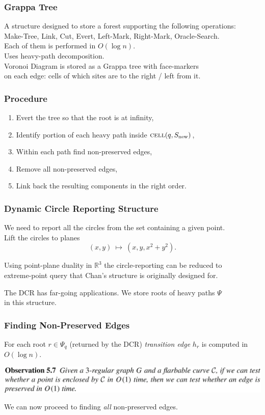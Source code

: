 \begin{frame} \frametitle{Grappa Tree}
	A structure designed to store a forest supporting the following operations: \\
	Make-Tree, Link, Cut, Evert, Left-Mark, Right-Mark, Oracle-Search. \\
	Each of them is performed in $O(\log n)$. \\ \bigskip
	Uses heavy-path decomposition. \\ \bigskip
	Voronoi Diagram is stored as a Grappa tree with face-markers \\
	on each edge: cells of which sites are to the right / left from it.
\end{frame}

\begin{frame} \frametitle{Procedure}
\begin{enumerate}
	\item Evert the tree so that the root is at infinity, \medskip
	\item Identify portion of each heavy path inside $\text{\scshape cell} (q, S_{\text{new}})$, \medskip
	\item Within each path find non-preserved edges, \medskip
	\item Remove all non-preserved edges, \medskip
	\item Link back the resulting components in the right order.
\end{enumerate}
\end{frame}

\begin{frame} \frametitle{Dynamic Circle Reporting Structure} \label{pg:dcr}
	We need to report all the circles from the set containing a given point. \\
	Lift the circles to planes
	$$(x,y)\ \mapsto\ (x,y,x^2+y^2).$$ \vspace{-0.4cm}
	
	Using point-plane duality in $\mathbb R^3$ the circle-reporting can be reduced to \\
	extreme-point query that Chan's structure is originally designed for. \bigskip
	
	The DCR has far-going applications. We store roots of heavy paths $\Psi$ \\
	in this structure.
\end{frame}

\begin{frame} \frametitle{Finding Non-Preserved Edges}
	For each root $r \in \Psi_q$ (returned by the DCR) {\it transition edge} $h_r$ is computed in $O(\log n)$. \\ [0.8cm]
\begin{center}
	\includegraphics[width=14cm]{figs/5-7.png} \\ [0.7cm]
\end{center}
	We can now proceed to finding {\it all} non-preserved edges.
\end{frame}


